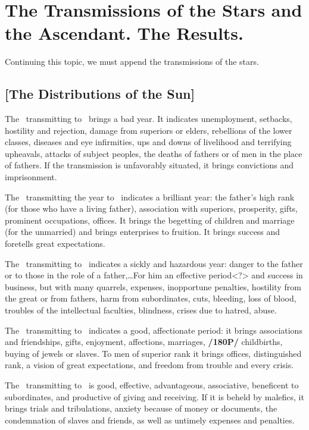 \section{The Transmissions of the Stars and the Ascendant. The Results.}

Continuing this topic, we must append the transmissions of the stars.

\subsection{[The Distributions of the Sun]}
The \Sun\, transmitting to \Saturn\, brings a bad year. It indicates unemployment, setbacks, hostility and
rejection, damage from superiors or elders, rebellions of the lower classes, diseases and eye infirmities, ups and downs of livelihood and terrifying upheavals, attacks of subject peoples, the deaths of fathers or of men in the place of fathers. If the transmission is unfavorably situated, it brings convictions and imprisonment.

The \Sun\, transmitting the year to \Jupiter\, indicates a brilliant year: the father’s high rank (for those who have a living father), association with superiors, prosperity, gifts, prominent occupations, offices. It brings
the begetting of children and marriage (for the unmarried) and brings enterprises to fruition. It brings success and foretells great expectations.

The \Sun\, transmitting to \Mars\, indicates a sickly and hazardous year: danger to the father or to those in
the role of a father,\ldots For him an effective period<?> and success in business, but with many quarrels, expenses, inopportune penalties, hostility from the great or from fathers, harm from subordinates, cuts, bleeding, loss of blood, troubles of the intellectual faculties, blindness, crises due to hatred, abuse.

The \Sun\, transmitting to \Venus\, indicates a good, affectionate period: it brings associations and friendships, gifts, enjoyment, affections, marriages, \textbf{/180P/} childbirths, buying of jewels or slaves. To men of superior rank it brings offices, distinguished rank, a vision of great expectations, and freedom from trouble and every crisis.

The \Sun\, transmitting to \Mercury\, is good, effective, advantageous, associative, beneficent to subordinates, and productive of giving and receiving. If it is beheld by malefics, it brings trials and tribulations, anxiety because of money or documents, the condemnation of slaves and friends, as well as untimely expenses and penalties.

